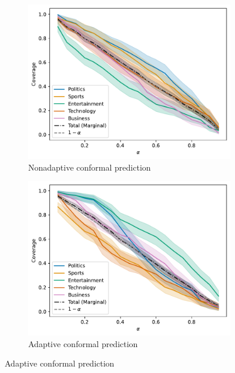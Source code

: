 \documentclass[a4paper, 12pt]{article}
\begin{document}
\begin{figure}[ht]
    \centering
    \begin{subfigure}[b]{0.5\linewidth}
        \includegraphics[width=\linewidth]{figures/nonadaptive_conditional_coverage.pdf}
        \caption{Nonadaptive conformal prediction}
        \label{fig:nonadaptive_coverage}
    \end{subfigure}
    \begin{subfigure}[b]{0.5\linewidth}
        \includegraphics[width=\linewidth]{figures/adaptive_conditional_coverage.pdf}
        \caption{Adaptive conformal prediction}
        \label{fig:adaptive_coverage}
    \end{subfigure}

\end{figure}
\end{document}

